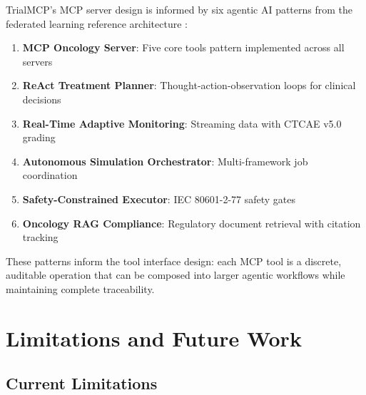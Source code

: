 \documentclass[10pt,letterpaper]{article}
\begin{document}
TrialMCP's MCP server design is informed by six agentic AI patterns from the federated learning reference architecture \cite{kawchak2026fl}:

\begin{enumerate}[leftmargin=2em]
    \item \textbf{MCP Oncology Server}: Five core tools pattern implemented across all servers
    \item \textbf{ReAct Treatment Planner}: Thought-action-observation loops for clinical decisions
    \item \textbf{Real-Time Adaptive Monitoring}: Streaming data with CTCAE v5.0 grading
    \item \textbf{Autonomous Simulation Orchestrator}: Multi-framework job coordination
    \item \textbf{Safety-Constrained Executor}: IEC 80601-2-77 safety gates
    \item \textbf{Oncology RAG Compliance}: Regulatory document retrieval with citation tracking
\end{enumerate}

These patterns inform the tool interface design: each MCP tool is a discrete, auditable operation that can be composed into larger agentic workflows while maintaining complete traceability.

\section{Limitations and Future Work}

\subsection{Current Limitations}
\end{document}
